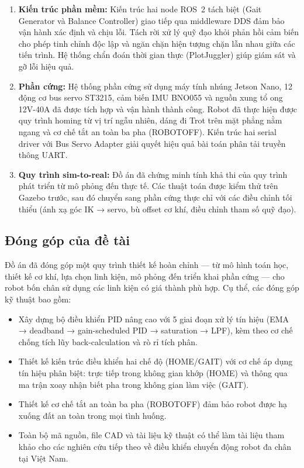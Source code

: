 \begin{enumerate}
    \item \textbf{Kiến trúc phần mềm:} Kiến trúc hai node ROS~2 tách biệt (Gait Generator và Balance Controller) giao tiếp qua middleware DDS đảm bảo vận hành xác định và chịu lỗi. Tách rời xử lý quỹ đạo khỏi phản hồi cảm biến cho phép tinh chỉnh độc lập và ngăn chặn hiện tượng chặn lẫn nhau giữa các tiến trình. Hệ thống chẩn đoán thời gian thực (PlotJuggler) giúp giám sát và gỡ lỗi hiệu quả.

    \item \textbf{Phần cứng:} Hệ thống phần cứng sử dụng máy tính nhúng Jetson Nano, 12 động cơ bus servo ST3215, cảm biến IMU BNO055 và nguồn xung tổ ong 12V-40A đã được tích hợp và vận hành thành công. Robot đã thực hiện được quy trình homing từ vị trí ngẫu nhiên, dáng đi Trot trên mặt phẳng nằm ngang và cơ chế tắt an toàn ba pha (ROBOTOFF). Kiến trúc hai serial driver với Bus Servo Adapter giải quyết hiệu quả bài toán phân tải truyền thông UART.

    \item \textbf{Quy trình sim-to-real:} Đồ án đã chứng minh tính khả thi của quy trình phát triển từ mô phỏng đến thực tế. Các thuật toán được kiểm thử trên Gazebo trước, sau đó chuyển sang phần cứng thực chỉ với các điều chỉnh tối thiểu (ánh xạ góc IK → servo, bù offset cơ khí, điều chỉnh tham số quỹ đạo).
\end{enumerate}

\subsection{Đóng góp của đề tài}

Đồ án đã đóng góp một quy trình thiết kế hoàn chỉnh --- từ mô hình toán học, thiết kế cơ khí, lựa chọn linh kiện, mô phỏng đến triển khai phần cứng --- cho robot bốn chân sử dụng các linh kiện có giá thành phù hợp. Cụ thể, các đóng góp kỹ thuật bao gồm:

\begin{itemize}
    \item Xây dựng bộ điều khiển PID nâng cao với 5 giai đoạn xử lý tín hiệu (EMA → deadband → gain-scheduled PID → saturation → LPF), kèm theo cơ chế chống tích lũy back-calculation và rò rỉ tích phân.
    \item Thiết kế kiến trúc điều khiển hai chế độ (HOME/GAIT) với cơ chế áp dụng tín hiệu phân biệt: trực tiếp trong không gian khớp (HOME) và thông qua ma trận xoay nhận biết pha trong không gian làm việc (GAIT).
    \item Thiết kế cơ chế tắt an toàn ba pha (ROBOTOFF) đảm bảo robot được hạ xuống đất an toàn trong mọi tình huống.
    \item Toàn bộ mã nguồn, file CAD và tài liệu kỹ thuật có thể làm tài liệu tham khảo cho các nghiên cứu tiếp theo về điều khiển chuyển động robot đa chân tại Việt Nam.
\end{itemize}

